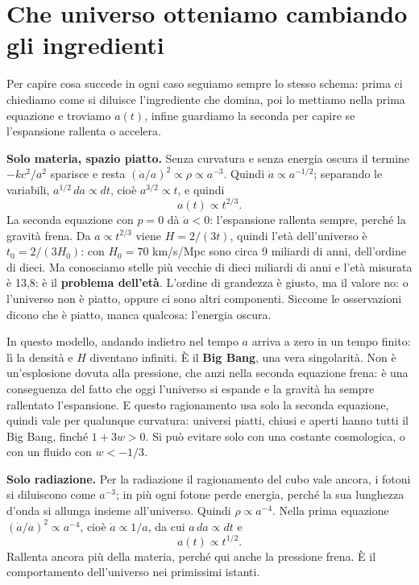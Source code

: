 \documentclass[12pt,a4paper]{article}
\begin{document}
\section{Che universo otteniamo cambiando gli ingredienti}
Per capire cosa succede in ogni caso seguiamo sempre lo stesso schema: prima ci chiediamo come si diluisce l'ingrediente che domina, poi lo mettiamo nella prima equazione e troviamo $a(t)$, infine guardiamo la seconda per capire se l'espansione rallenta o accelera.

\textbf{Solo materia, spazio piatto.} Senza curvatura e senza energia oscura il termine $-kc^2/a^2$ sparisce e resta $(\dot a/a)^2 \propto \rho \propto a^{-3}$. Quindi $\dot a \propto a^{-1/2}$; separando le variabili, $a^{1/2}\,da \propto dt$, cioè $a^{3/2} \propto t$, e quindi
\[ a(t) \propto t^{2/3} . \]
La seconda equazione con $p = 0$ dà $\ddot a < 0$: l'espansione rallenta sempre, perché la gravità frena. Da $a \propto t^{2/3}$ viene $H = 2/(3t)$, quindi l'età dell'universo è $t_0 = 2/(3H_0)$: con $H_0 = 70$ km/s/Mpc sono circa 9 miliardi di anni, dell'ordine di dieci. Ma conosciamo stelle più vecchie di dieci miliardi di anni e l'età misurata è 13,8: è il \textbf{problema dell'età}. L'ordine di grandezza è giusto, ma il valore no: o l'universo non è piatto, oppure ci sono altri componenti. Siccome le osservazioni dicono che è piatto, manca qualcosa: l'energia oscura.

In questo modello, andando indietro nel tempo $a$ arriva a zero in un tempo finito: lì la densità e $H$ diventano infiniti. È il \textbf{Big Bang}, una vera singolarità. Non è un'esplosione dovuta alla pressione, che anzi nella seconda equazione frena: è una conseguenza del fatto che oggi l'universo si espande e la gravità ha sempre rallentato l'espansione. E questo ragionamento usa solo la seconda equazione, quindi vale per qualunque curvatura: universi piatti, chiusi e aperti hanno tutti il Big Bang, finché $1 + 3w > 0$. Si può evitare solo con una costante cosmologica, o con un fluido con $w < -1/3$.

\textbf{Solo radiazione.} Per la radiazione il ragionamento del cubo vale ancora, i fotoni si diluiscono come $a^{-3}$; in più ogni fotone perde energia, perché la sua lunghezza d'onda si allunga insieme all'universo. Quindi $\rho \propto a^{-4}$. Nella prima equazione $(\dot a/a)^2 \propto a^{-4}$, cioè $\dot a \propto 1/a$, da cui $a\,da \propto dt$ e
\[ a(t) \propto t^{1/2} . \]
Rallenta ancora più della materia, perché qui anche la pressione frena. È il comportamento dell'universo nei primissimi istanti.
\end{document}
